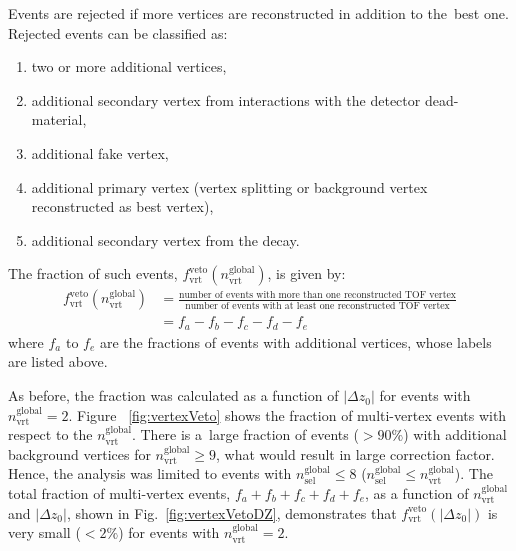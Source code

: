 Events are rejected if more vertices are reconstructed in addition to the~best one. Rejected events can be classified as:

\begin{enumerate}[label=\alph*)]
	\item two or more additional vertices,
	\item additional  secondary vertex from interactions with the detector dead-material,
	\item additional fake  vertex,
	\item additional primary  vertex (vertex splitting or background vertex reconstructed as best vertex),
	\item additional secondary vertex from the decay.  
\end{enumerate}
The fraction of such events, $f_\textrm{vrt}^\textrm{veto}\left(n_\textrm{vrt}^\textrm{global}\right)$, is given by: 
\begin{equation}
\begin{split}
f_\textrm{vrt}^\textrm{veto}\left(n_\textrm{vrt}^\textrm{global}\right) & =\frac{\textrm{number of events with more than one reconstructed  TOF vertex}}{\textrm{number of events with at least one reconstructed TOF vertex}} \\
& =f_a-f_b-f_c-f_d-f_e
\end{split}
\label{eq:vertexVetoEq}
\end{equation}
where $f_a$ to $f_e$ are the fractions of events with additional vertices, whose labels  are listed above.%

As before, the fraction was calculated as a function of $|\Delta z_0|$ for events with $n^\textrm{global}_\textrm{vrt}=2$. Figure~ \ref{fig:vertexVeto} shows the fraction of multi-vertex events  with respect to the $n_\textrm{vrt}^\textrm{global}$. There is a~large fraction of events ($>90\%$) with additional background vertices for $n_\textrm{vrt}^\textrm{global}\geq 9$, what would result in large correction factor. Hence, the analysis was limited to events with $n_\textrm{sel}^\textrm{global}\leq8$ ($n_\textrm{sel}^\textrm{global}\leq n_\textrm{vrt}^\textrm{global}$). The total fraction of multi-vertex events, $f_a+f_b+f_c+f_d+f_e$, as a function of $n^\textrm{global}_\textrm{vrt}$ and $|\Delta z_0|$, shown in Fig.~\ref{fig:vertexVetoDZ}, demonstrates that $f_\textrm{vrt}^\textrm{veto}(|\Delta z_0|)$ is very small ($<2\%$) for events with $n^\textrm{global}_\textrm{vrt}=2$.

